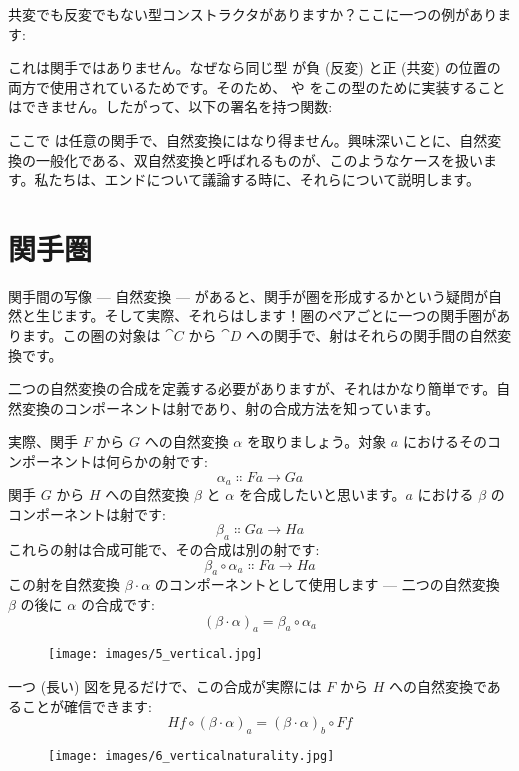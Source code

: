 共変でも反変でもない型コンストラクタがありますか？ここに一つの例があります: 

これは関手ではありません。なぜなら同じ型  が負 (反変) と正 (共変) の位置の両方で使用されているためです。そのため、 や  をこの型のために実装することはできません。したがって、以下の署名を持つ関数: 

ここで  は任意の関手で、自然変換にはなり得ません。興味深いことに、自然変換の一般化である、双自然変換と呼ばれるものが、このようなケースを扱います。私たちは、エンドについて議論する時に、それらについて説明します。

\section{関手圏}

関手間の写像 --- 自然変換 --- があると、関手が圏を形成するかという疑問が自然と生じます。そして実際、それらはします！圏のペアごとに一つの関手圏があります。この圏の対象は $\cat{C}$ から $\cat{D}$ への関手で、射はそれらの関手間の自然変換です。

二つの自然変換の合成を定義する必要がありますが、それはかなり簡単です。自然変換のコンポーネントは射であり、射の合成方法を知っています。

実際、関手 $F$ から $G$ への自然変換 $\alpha$ を取りましょう。対象 $a$ におけるそのコンポーネントは何らかの射です: 
\[\alpha_a \Colon F a \to G a\]
関手 $G$ から $H$ への自然変換 $\beta$ と $\alpha$ を合成したいと思います。$a$ における $\beta$ のコンポーネントは射です: 
\[\beta_a \Colon G a \to H a\]
これらの射は合成可能で、その合成は別の射です: 
\[\beta_a \circ \alpha_a \Colon F a \to H a\]
この射を自然変換 $\beta \cdot \alpha$ のコンポーネントとして使用します --- 二つの自然変換 $\beta$ の後に $\alpha$ の合成です: 
\[(\beta \cdot \alpha)_a = \beta_a \circ \alpha_a\]

\begin{figure}[H]
  \centering
  \texttt{[image: images/5\_vertical.jpg]}
\end{figure}

\noindent
一つ (長い) 図を見るだけで、この合成が実際には $F$ から $H$ への自然変換であることが確信できます: 
\[H f \circ (\beta \cdot \alpha)_a = (\beta \cdot \alpha)_b \circ F f\]

\begin{figure}[H]
  \centering
  \texttt{[image: images/6\_verticalnaturality.jpg]}
\end{figure}

